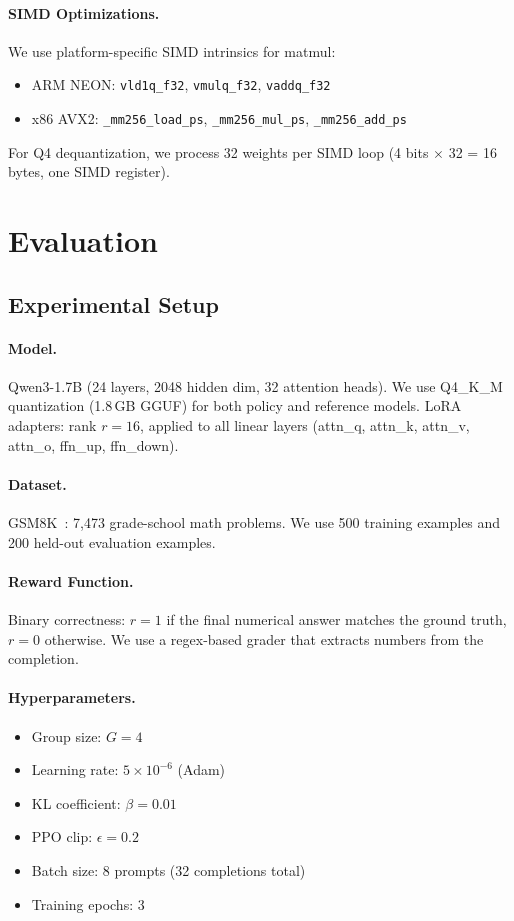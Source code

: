 \documentclass[sigconf,review,anonymous]{acmart}
\begin{document}
\paragraph{SIMD Optimizations.} We use platform-specific SIMD intrinsics for matmul:
\begin{itemize}
\item ARM NEON: \texttt{vld1q\_f32}, \texttt{vmulq\_f32}, \texttt{vaddq\_f32}
\item x86 AVX2: \texttt{\_mm256\_load\_ps}, \texttt{\_mm256\_mul\_ps}, \texttt{\_mm256\_add\_ps}
\end{itemize}
For Q4 dequantization, we process 32 weights per SIMD loop (4 bits $\times$ 32 = 16 bytes, one SIMD register).

\section{Evaluation}
\label{sec:eval}

\subsection{Experimental Setup}

\paragraph{Model.} Qwen3-1.7B (24 layers, 2048 hidden dim, 32 attention heads). We use Q4\_K\_M quantization (1.8\,GB GGUF) for both policy and reference models. LoRA adapters: rank $r=16$, applied to all linear layers (attn\_q, attn\_k, attn\_v, attn\_o, ffn\_up, ffn\_down).

\paragraph{Dataset.} GSM8K~\cite{cobbe2021gsm8k}: 7,473 grade-school math problems. We use 500 training examples and 200 held-out evaluation examples.

\paragraph{Reward Function.} Binary correctness: $r=1$ if the final numerical answer matches the ground truth, $r=0$ otherwise. We use a regex-based grader that extracts numbers from the completion.

\paragraph{Hyperparameters.}
\begin{itemize}
\item Group size: $G=4$
\item Learning rate: $5 \times 10^{-6}$ (Adam)
\item KL coefficient: $\beta = 0.01$
\item PPO clip: $\epsilon = 0.2$
\item Batch size: 8 prompts (32 completions total)
\item Training epochs: 3
\end{itemize}
\end{document}
